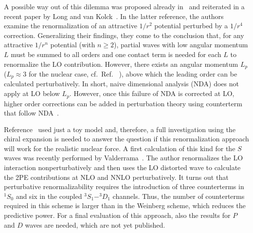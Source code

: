 \documentclass[sort&compress,preprint,3p]{elsarticle}
\begin{document}
A possible way out of this dilemma was proposed already in~\cite{NTK05}
and reiterated in a recent paper by Long and van Kolck~\cite{LK08}. In the latter
reference, the authors examine the renormalization of an attractive $1/r^2$ potential
perturbed by a $1/r^4$ correction.
Generalizing their findings, they come to
the conclusion that, for any attractive $1/r^n$ potential (with $n\geq 2$),
partial waves with low angular momentum $L$ must be summed to all orders
and one contact term is needed for each $L$ to renormalize the LO
contribution. However, there exists
an angular momentum $L_p$ ($L_p\approx 3$ for the nuclear case, cf.\ Ref. ~\cite{NTK05}), 
above which the leading order can be calculated perturbatively. 
In short, naive dimensional analysis (NDA) does not apply at LO below $L_p$.
However, once this failure of NDA is corrected at LO, higher order corrections
can be added in perturbation theory using counterterm that follow NDA~\cite{LK08}.

Reference~\cite{LK08} used just a toy model and, therefore, a full investigation 
using the chiral expansion is needed to answer the question 
if this renormalization approach will work for the realistic nuclear force.
A first calculation of this kind for the $S$ waves was recently performed by
Valderrama~\cite{Val09}. The author renormalizes the LO interaction nonperturbatively
and then uses the LO
distorted wave to calculate the 2PE contributions at NLO and NNLO
perturbatively. It turns out that perturbative renormalizability requires the introduction
of three counterterms in $^1S_0$ and six in the coupled $^3S_1-^3D_1$
channels. 
Thus, the number of counterterms required in this scheme is larger than in the
Weinberg scheme, which reduces the predictive power. For a final evaluation
of this approach, also the results for $P$ and $D$ waves are needed, which
are not yet published.
\end{document}
